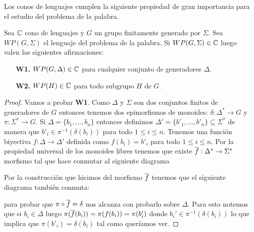 \documentclass[tesis.tex]{subfiles}
\begin{document}
Los conos de lenguajes cumplen la siguiente propiedad de gran importancia para el estudio del problema de la palabra.
\medskip
\begin{prop}\label{prop-cono-wp}
	Sea $\mathbb{C}$ cono de lenguajes y $G$ un grupo finitamente generado por $\Sigma$.
	Sea $WP(G, \Sigma)$ el lenguaje del problema de la palabra. 
	Si $WP(G, \Sigma) \in \mathbb{C}$ luego valen las siguientes afirmaciones:
	\begin{itemize}
		\item[\textbf{W1.}] $WP(G, \Delta) \in \mathbb{C}$ para cualquier conjunto de generadores $\Delta$.
		\item[\textbf{W2.}] $WP(H) \in \mathbb{C}$ para todo subgrupo $H$ \fg de $G$.
	\end{itemize} 
\end{prop}
\begin{proof}
	Vamos a probar \textbf{W1}.
	Como $\Delta$ y $\Sigma$ son dos conjuntos finitos de generadores de $G$ entonces tenemos dos epimorfismos de monoides:
	$\delta: \Delta^* \to G$ y $\pi:\Sigma^* \to G$.
	Si $\Delta = \{ b_{1}, \dots, b_{n} \}$ entonces definimos $\Delta' = \{ b'_{1}, \dots, b'_{n}   \} \subseteq \Sigma^*$ de manera que $b'_{i} \in \pi^{-1}(\delta(b_{i}))$ para todo $1 \le i \le n$.
	Tenemos una función biyectiva $f:\Delta \to \Delta'$ definida como $f(b_{i}) = b'_{i}$ para todo $1 \le i \le n$.
	Por la propiedad universal de los monoides libres tenemos que existe $\overline f: \Delta^* \to \Sigma^*$ morfismo tal que hace conmutar al siguiente diagrama
	\begin{center}
	\end{center}
	
	Por la construcción que hicimos del morfismo $\overline f$ tenemos que el siguiente diagrama también conmuta:
	\begin{center}
	\end{center}
	para probar que $\pi \circ \overline f = \delta$ nos alcanza con probarlo sobre $\Delta$.
	Para esto notemos que si $b_{i} \in \Delta$ luego $\pi(\overline f(b_{i})) = \pi(f(b_{i})) = \pi(b_{i}')$ donde $b_{i}' \in \pi^{-1}(\delta(b_{i}))$ lo que implica que $\pi(b'_{i}) = \delta(b_{i})$ tal como queríamos ver.
	

\end{proof}
\end{document}
